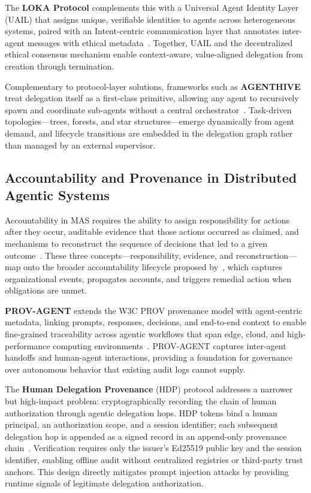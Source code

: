 The \textbf{LOKA Protocol} complements this with a Universal Agent Identity Layer (UAIL) that assigns unique, verifiable identities to agents across heterogeneous systems, paired with an Intent-centric communication layer that annotates inter-agent messages with ethical metadata~\cite{loka2025}. Together, UAIL and the decentralized ethical consensus mechanism enable context-aware, value-aligned delegation from creation through termination.

Complementary to protocol-layer solutions, frameworks such as \textbf{AGENTHIVE} treat delegation itself as a first-class primitive, allowing any agent to recursively spawn and coordinate sub-agents without a central orchestrator~\cite{agenthive2025}. Task-driven topologies---trees, forests, and star structures---emerge dynamically from agent demand, and lifecycle transitions are embedded in the delegation graph rather than managed by an external supervisor.

\subsection{Accountability and Provenance in Distributed Agentic Systems}
\label{sec:provenance}

Accountability in MAS requires the ability to assign responsibility for actions after they occur, auditable evidence that those actions occurred as claimed, and mechanisms to reconstruct the sequence of decisions that led to a given outcome~\cite{auditability2025}. These three concepts---responsibility, evidence, and reconstruction---map onto the broader accountability lifecycle proposed by~\cite{vasconcelos2022accountability}, which captures organizational events, propagates accounts, and triggers remedial action when obligations are unmet.

\textbf{PROV-AGENT} extends the W3C PROV provenance model with agent-centric metadata, linking prompts, responses, decisions, and end-to-end context to enable fine-grained traceability across agentic workflows that span edge, cloud, and high-performance computing environments~\cite{provagent2025}. PROV-AGENT captures inter-agent handoffs and human-agent interactions, providing a foundation for governance over autonomous behavior that existing audit logs cannot supply.

The \textbf{Human Delegation Provenance} (HDP) protocol addresses a narrower but high-impact problem: cryptographically recording the chain of human authorization through agentic delegation hops. HDP tokens bind a human principal, an authorization scope, and a session identifier; each subsequent delegation hop is appended as a signed record in an append-only provenance chain~\cite{draft-hdp2026}. Verification requires only the issuer's Ed25519 public key and the session identifier, enabling offline audit without centralized registries or third-party trust anchors. This design directly mitigates prompt injection attacks by providing runtime signals of legitimate delegation authorization.

